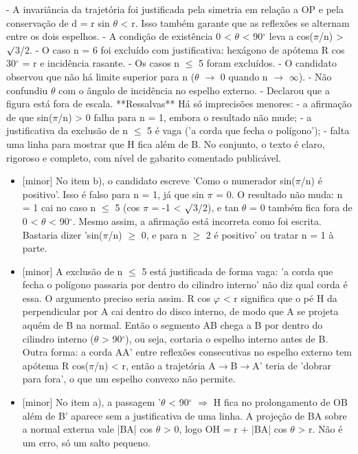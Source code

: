 \documentclass{article}%
\begin{document}
{-} A invariância da trajetória foi justificada pela simetria em relação a OP e pela conservação de d = r sin $\theta$ < r. Isso também garante que as reflexões se alternam entre os dois espelhos.\newline%
{-} A condição de existência 0 < $\theta$ < 90$^\circ$ leva a cos($\pi$/n) > $\surd$3/2.\newline%
{-} O caso n = 6 foi excluído com justificativa: hexágono de apótema R cos 30$^\circ$ = r e incidência rasante.\newline%
{-} Os casos n $\leq$ 5 foram excluídos.\newline%
{-} O candidato observou que não há limite superior para n ($\theta$ $\to$ 0 quando n $\to$ $\infty$).\newline%
{-} Não confundiu $\theta$ com o ângulo de incidência no espelho externo.\newline%
{-} Declarou que a figura está fora de escala.\newline%
\newline%
**Ressalvas**\newline%
Há só imprecisões menores:\newline%
{-} a afirmação de que sin($\pi$/n) > 0 falha para n = 1, embora o resultado não mude;\newline%
{-} a justificativa da exclusão de n $\leq$ 5 é vaga ('a corda que fecha o polígono');\newline%
{-} falta uma linha para mostrar que H fica além de B.\newline%
\newline%
No conjunto, o texto é claro, rigoroso e completo, com nível de gabarito comentado publicável.%
\begin{itemize}%
\item%
{[}minor{]} No item b), o candidato escreve 'Como o numerador sin($\pi$/n) é positivo'. Isso é falso para n = 1, já que sin $\pi$ = 0. O resultado não muda: n = 1 cai no caso n $\leq$ 5 (cos $\pi$ = -1 < $\surd$3/2), e tan $\theta$ = 0 também fica fora de 0 < $\theta$ < 90$^\circ$. Mesmo assim, a afirmação está incorreta como foi escrita. Bastaria dizer 'sin($\pi$/n) $\geq$ 0, e para n $\geq$ 2 é positivo' ou tratar n = 1 à parte.%
\item%
{[}minor{]} A exclusão de n $\leq$ 5 está justificada de forma vaga: 'a corda que fecha o polígono passaria por dentro do cilindro interno' não diz qual corda é essa. O argumento preciso seria assim. R cos $\varphi$ < r significa que o pé H da perpendicular por A cai dentro do disco interno, de modo que A se projeta aquém de B na normal. Então o segmento AB chega a B por dentro do cilindro interno ($\theta$ > 90$^\circ$), ou seja, cortaria o espelho interno antes de B. Outra forma: a corda AA' entre reflexões consecutivas no espelho externo tem apótema R cos($\pi$/n) < r, então a trajetória A$\to$B$\to$A' teria de 'dobrar para fora', o que um espelho convexo não permite.%
\item%
{[}minor{]} No item a), a passagem '$\theta$ < 90$^\circ$ $\Rightarrow$ H fica no prolongamento de OB além de B' aparece sem a justificativa de uma linha. A projeção de BA sobre a normal externa vale |BA| cos $\theta$ > 0, logo OH = r + |BA| cos $\theta$ > r. Não é um erro, só um salto pequeno.%
\end{itemize}%
\end{document}
